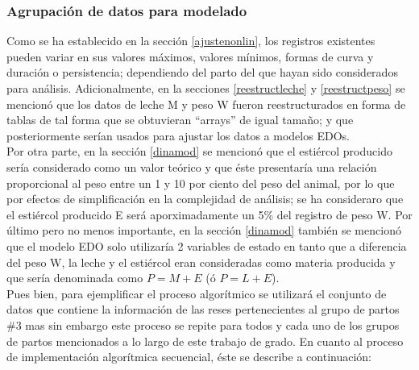 \subsubsection{Agrupación de datos para modelado}

Como se ha establecido en la sección \ref{ajustenonlin}, los registros existentes pueden variar en sus valores máximos, valores mínimos, formas de curva y duración o persistencia; dependiendo del parto del que hayan sido considerados para análisis. Adicionalmente, en la secciones \ref{reestructleche} y \ref{reestructpeso} se mencionó que los datos de leche M y peso W fueron reestructurados en forma de tablas de tal forma que se obtuvieran ``arrays'' de igual tamaño; y que posteriormente serían usados para ajustar los datos a modelos EDOs.\\

Por otra parte, en la sección \ref{dinamod} se mencionó que el estiércol producido sería considerado como un valor teórico y que éste presentaría una relación proporcional al peso entre un 1 y 10 por ciento del peso del animal, por lo que por efectos de simplificación en la complejidad de análisis; se ha consideraro que el estiércol producido E será aporximadamente un 5\% del registro de peso W. Por último pero no menos importante, en la sección \ref{dinamod} también se mencionó que el modelo EDO solo utilizaría 2 variables de estado en tanto que a diferencia del peso W, la leche y el estiércol eran consideradas como materia producida y que sería denominada como $P=M+E$ (ó $P=L+E$).\\

Pues bien, para ejemplificar el proceso algorítmico se utilizará el conjunto de datos que contiene la información de las reses pertenecientes al grupo de partos \#3 mas sin embargo este proceso se repite para todos y cada uno de los grupos de partos mencionados a lo largo de este trabajo de grado. En cuanto al proceso de implementación algorítmica secuencial, éste se describe a continuación:

